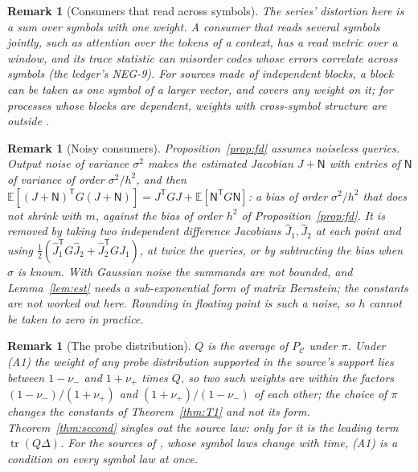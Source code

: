 \documentclass[11pt,onecolumn]{IEEEtran}
\newtheorem{remark}[theorem]{Remark}
\newcommand{\E}{\mathbb{E}}
\newcommand{\tr}{\operatorname{tr}}
\newcommand{\PC}{P_{\mathcal C}}
\newcommand{\nup}{\nu_{+}}
\newcommand{\num}{\nu_{-}}
\begin{document}
\begin{remark}[Consumers that read across symbols]
The series' distortion here is a sum over symbols with one weight. A
consumer that reads several symbols jointly, such as attention over the
tokens of a context, has a read metric over a window, and its trace
statistic can misorder codes whose errors correlate across symbols (the
ledger's NEG-9). For sources made of independent blocks, a block can be
taken as one symbol of a larger vector, and \cite{part1} covers any weight
on it; for processes whose blocks are dependent, weights with cross-symbol
structure are outside \cite{part2,part3,part4}.
\end{remark}

\begin{remark}[Noisy consumers]\label{rem:fd}
Proposition~\ref{prop:fd} assumes noiseless queries. Output noise of variance
$\sigma^2$ makes the estimated Jacobian $J+\mathsf N$ with entries of $\mathsf N$ of
variance of order $\sigma^2/h^2$, and then
$\E[(J+\mathsf N)^{\mathsf T}G(J+\mathsf N)]=J^{\mathsf T}GJ+\E[\mathsf N^{\mathsf T}G\mathsf N]$:
a bias of order $\sigma^2/h^2$ that does not shrink with $m$, against the bias of order
$h^2$ of Proposition~\ref{prop:fd}. It is removed by taking two independent difference
Jacobians $\hat J_1,\hat J_2$ at each point and using
$\tfrac12(\hat J_1^{\mathsf T}G\hat J_2+\hat J_2^{\mathsf T}G\hat J_1)$, at twice the
queries, or by subtracting the bias when $\sigma$ is known. With Gaussian noise the
summands are not bounded, and Lemma~\ref{lem:est} needs a sub-exponential form of
matrix Bernstein; the constants are not worked out here. Rounding in floating point is
such a noise, so $h$ cannot be taken to zero in practice.
\end{remark}

\begin{remark}[The probe distribution]
$Q$ is the average of $\PC$ under $\pi$. Under (A1) the weight of any probe
distribution supported in the source's support lies between $1-\num$ and
$1+\nup$ times $Q$, so two such weights are within the factors
$(1-\num)/(1+\nup)$ and $(1+\nup)/(1-\num)$ of each other; the choice of $\pi$
changes the constants of Theorem~\ref{thm:T1} and not its form.
Theorem~\ref{thm:second} singles out the source law: only for it is the leading
term $\tr(Q\Delta)$. For the sources of \cite{part3,part4}, whose symbol laws change
with time, (A1) is a condition on every symbol law at once.
\end{remark}
\end{document}
